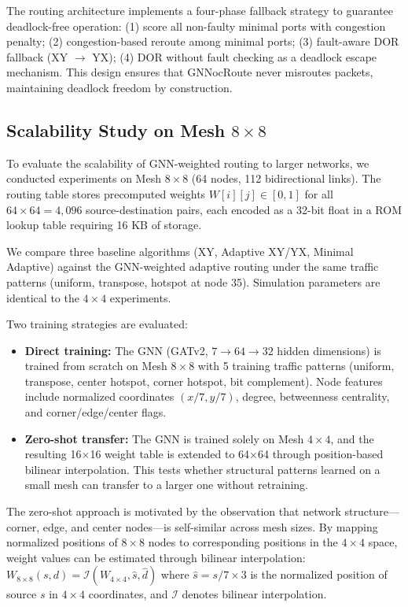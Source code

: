 The routing architecture implements a four-phase fallback strategy to guarantee deadlock-free operation: (1) score all non-faulty minimal ports with congestion penalty; (2) congestion-based reroute among minimal ports; (3) fault-aware DOR fallback (XY $\rightarrow$ YX); (4) DOR without fault checking as a deadlock escape mechanism. This design ensures that GNNocRoute never misroutes packets, maintaining deadlock freedom by construction.

\subsection{Scalability Study on Mesh $8\times8$}
\label{sec:scalability}

To evaluate the scalability of GNN-weighted routing to larger networks, we conducted experiments on Mesh $8\times8$ (64 nodes, 112 bidirectional links). The routing table stores precomputed weights $W[i][j] \in [0,1]$ for all $64 \times 64 = 4,096$ source-destination pairs, each encoded as a 32-bit float in a ROM lookup table requiring 16 KB of storage.

We compare three baseline algorithms (XY, Adaptive XY/YX, Minimal Adaptive) against the GNN-weighted adaptive routing under the same traffic patterns (uniform, transpose, hotspot at node 35). Simulation parameters are identical to the $4\times4$ experiments.

Two training strategies are evaluated:
\begin{itemize}
    \item \textbf{Direct training:} The GNN (GATv2, $7\rightarrow 64 \rightarrow 32$ hidden dimensions) is trained from scratch on Mesh $8\times8$ with 5 training traffic patterns (uniform, transpose, center hotspot, corner hotspot, bit complement). Node features include normalized coordinates $(x/7, y/7)$, degree, betweenness centrality, and corner/edge/center flags.
    \item \textbf{Zero-shot transfer:} The GNN is trained solely on Mesh $4\times4$, and the resulting 16$\times$16 weight table is extended to 64$\times$64 through position-based bilinear interpolation. This tests whether structural patterns learned on a small mesh can transfer to a larger one without retraining.
\end{itemize}

The zero-shot approach is motivated by the observation that network structure---corner, edge, and center nodes---is self-similar across mesh sizes. By mapping normalized positions of $8\times8$ nodes to corresponding positions in the $4\times4$ space, weight values can be estimated through bilinear interpolation: $W_{8\times8}(s,d) = \mathcal{I}(W_{4\times4}, \hat{s}, \hat{d})$ where $\hat{s} = s / 7 \times 3$ is the normalized position of source $s$ in $4\times4$ coordinates, and $\mathcal{I}$ denotes bilinear interpolation.
